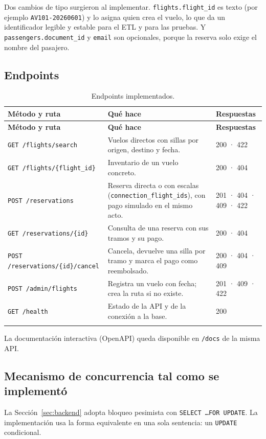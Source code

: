 \documentclass[10pt,letterpaper]{article}
\begin{document}
Dos cambios de tipo surgieron al implementar. \texttt{flights.flight\_id} es texto (por ejemplo \texttt{AV101-20260601}) y lo asigna quien crea el vuelo, lo que da un identificador legible y estable para el ETL y para las pruebas. Y \texttt{passengers.document\_id} y \texttt{email} son opcionales, porque la reserva solo exige el nombre del pasajero.

\subsection{Endpoints}
\begin{longtable}{@{}L{5.2cm} L{6.6cm} L{3.8cm}@{}}
\toprule \textbf{Método y ruta} & \textbf{Qué hace} & \textbf{Respuestas} \\ \midrule \endfirsthead
\toprule \textbf{Método y ruta} & \textbf{Qué hace} & \textbf{Respuestas} \\ \midrule \endhead
\texttt{GET /flights/search} & Vuelos directos con sillas por origen, destino y fecha. & 200 · 422 \\
\texttt{GET /flights/\{flight\_id\}} & Inventario de un vuelo concreto. & 200 · 404 \\
\texttt{POST /reservations} & Reserva directa o con escalas (\texttt{connection\_flight\_ids}), con pago simulado en el mismo acto. & 201 · 404 · 409 · 422 \\
\texttt{GET /reservations/\{id\}} & Consulta de una reserva con sus tramos y su pago. & 200 · 404 \\
\texttt{POST /reservations/\{id\}/cancel} & Cancela, devuelve una silla por tramo y marca el pago como reembolsado. & 200 · 404 · 409 \\
\texttt{POST /admin/flights} & Registra un vuelo con fecha; crea la ruta si no existe. & 201 · 409 · 422 \\
\texttt{GET /health} & Estado de la API y de la conexión a la base. & 200 \\
\bottomrule
\caption{Endpoints implementados.}
\end{longtable}

La documentación interactiva (OpenAPI) queda disponible en \texttt{/docs} de la misma API.

\subsection{Mecanismo de concurrencia tal como se implementó}
La Sección~\ref{sec:backend} adopta bloqueo pesimista con \texttt{SELECT \ldots FOR UPDATE}. La implementación usa la forma equivalente en una sola sentencia: un \texttt{UPDATE} condicional.
\end{document}
